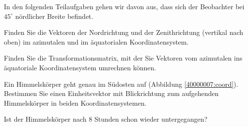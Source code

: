 In den folgenden Teilaufgaben gehen wir davon aus, dass sich der Beobachter
bei $45^\circ$ nördlicher Breite befindet.
\begin{teilaufgaben}
\item Finden Sie die Vektoren der Nordrichtung und der Zenithrichtung
(vertikal nach oben) im azimutalen und im äquatorialen Koordinatensystem.
\item Finden Sie die Transformationsmatrix, mit der Sie Vektoren
vom azimutalen ins äquatoriale Koordinatensystem umrechnen können.
\item Ein Himmelskörper geht genau im Südosten auf
(Abbildung \ref{40000007:coord}).
Bestimmen Sie einen Einheitsvektor mit Blickrichtung zum
aufgehenden Himmelskörper in beiden Koordinatensystemen.
\item Ist der Himmelskörper nach 8 Stunden schon wieder untergegangen?
\end{teilaufgaben}


